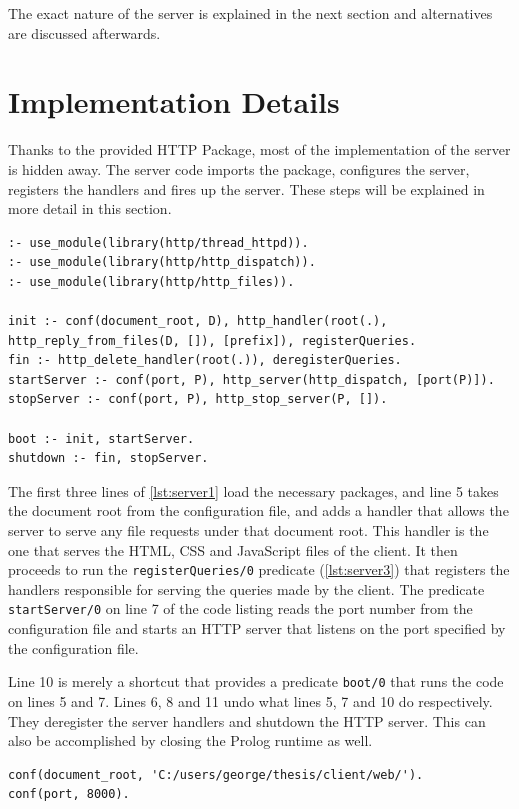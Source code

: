 \documentclass[11pt,twoside,a4paper]{report}
\begin{document}
The exact nature of the server is explained in the next section and alternatives are discussed afterwards.

\section{Implementation Details}
Thanks to the provided HTTP Package, most of the implementation of the server is hidden away. The server code imports the package, configures the server, registers the handlers and fires up the server. These steps will be explained in more detail in this section.

\begin{lstlisting}[caption={The Prolog code that configures and runs the server},label=lst:server1]
:- use_module(library(http/thread_httpd)).
:- use_module(library(http/http_dispatch)).
:- use_module(library(http/http_files)).

init :- conf(document_root, D), http_handler(root(.), http_reply_from_files(D, []), [prefix]), registerQueries.
fin :- http_delete_handler(root(.)), deregisterQueries.
startServer :- conf(port, P), http_server(http_dispatch, [port(P)]).
stopServer :- conf(port, P), http_stop_server(P, []).

boot :- init, startServer.
shutdown :- fin, stopServer.
\end{lstlisting}

The first three lines of \autoref{lst:server1} load the necessary packages, and line 5 takes the document root from the configuration file, and adds a handler that allows the server to serve any file requests under that document root. This handler is the one that serves the HTML, CSS and JavaScript files of the client. It then proceeds to run the \lstinline$registerQueries/0$ predicate (\autoref{lst:server3}) that registers the handlers responsible for serving the queries made by the client. The predicate \lstinline$startServer/0$ on line 7 of the code listing reads the port number from the configuration file and starts an HTTP server that listens on the port specified by the configuration file.

Line 10 is merely a shortcut that provides a predicate \lstinline$boot/0$ that runs the code on lines 5 and 7. Lines 6, 8 and 11 undo what lines 5, 7 and 10 do respectively. They deregister the server handlers and shutdown the HTTP server. This can also be accomplished by closing the Prolog runtime as well.

\begin{lstlisting}[caption={The server configuration file written in Prolog},label=lst:server2]
conf(document_root, 'C:/users/george/thesis/client/web/').
conf(port, 8000).
\end{lstlisting}
\end{document}
